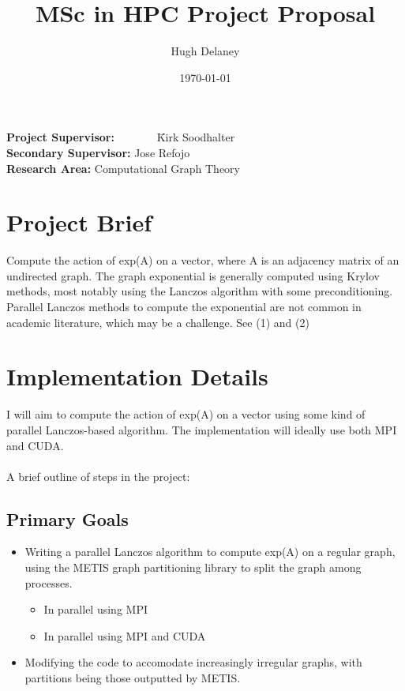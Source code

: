 \documentclass[a4paper, fleqn]{article}
\date{\today}
\author{Hugh Delaney}
\title{MSc in HPC Project Proposal}
\begin{document}
\maketitle
\begin{tabbing}
        \textbf{Project Supervisor:}~~~~~~~ \=Kirk Soodhalter \\
        \textbf{Secondary Supervisor:} \>Jose Refojo \\
        \textbf{Research Area:}  \> Computational Graph Theory \\
\end{tabbing}

\section*{Project Brief}%
\label{sec:project_brief}
Compute the action of exp(A) on a vector, where A is an  adjacency matrix of an undirected graph. The graph exponential is generally computed using Krylov methods, most notably using the Lanczos algorithm with some preconditioning. Parallel Lanczos methods to compute the exponential are not common in academic literature, which may be a challenge. See (1) and (2) 

\section*{Implementation Details}%
\label{sec:project_brief}

I will aim to compute the action of exp(A) on a vector using some kind of parallel Lanczos-based algorithm. The implementation will ideally use both MPI and CUDA.
\\ \\ A brief outline of steps in the project:

\subsection*{Primary Goals}%
\label{sub:primary_goals}


\begin{itemize}
        \item Writing a parallel Lanczos algorithm to compute exp(A) on a regular graph, using the METIS graph partitioning library to split the graph among processes.
                \begin{itemize}
                        \item In parallel using MPI
                        \item In parallel using MPI and CUDA
                \end{itemize}
        \item Modifying the code to accomodate increasingly irregular graphs, with partitions being those outputted by METIS.
\end{itemize}
\end{document}
